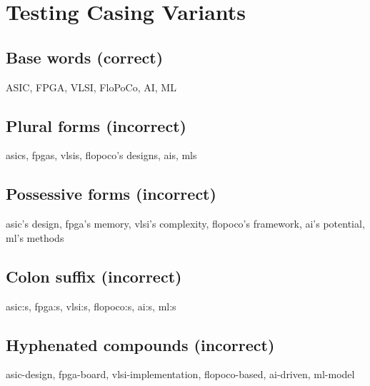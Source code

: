 \documentclass{article}
\begin{document}
\section{Testing Casing Variants}

\subsection{Base words (correct)}
ASIC, FPGA, VLSI, FloPoCo, AI, ML

\subsection{Plural forms (incorrect)}
asics, fpgas, vlsis, flopoco's designs, ais, mls

\subsection{Possessive forms (incorrect)}
asic's design, fpga's memory, vlsi's complexity, flopoco's framework, ai's potential, ml's methods

\subsection{Colon suffix (incorrect)}
asic:s, fpga:s, vlsi:s, flopoco:s, ai:s, ml:s

\subsection{Hyphenated compounds (incorrect)}
asic-design, fpga-board, vlsi-implementation, flopoco-based, ai-driven, ml-model
\end{document}
